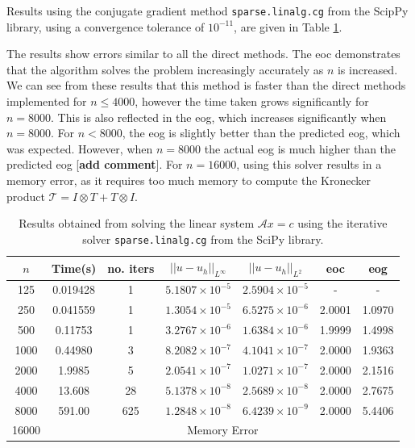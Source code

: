 \documentclass[11pt]{article}
\numberwithin{equation}{section}
\begin{document}
Results using the conjugate gradient method \texttt{sparse.linalg.cg} from the ScipPy library, using a convergence tolerance of $10^{-11}$, are given in Table \ref{table:kron it}. 

The results show errors similar to all the direct methods. The eoc demonstrates that the algorithm solves the problem increasingly accurately as $n$ is increased. We can see from these results that this method is faster than the direct methods implemented for $n \leq 4000$, however the time taken grows significantly for $n=8000$. This is also reflected in the eog, which increases significantly when $n=8000$. For $n<8000$, the eog is slightly better than the predicted eog, which was expected. However, when $n=8000$ the actual eog is much higher than the predicted eog [\textbf{add comment}]. For $n=16000$, using this solver results in a memory error, as it requires too much memory to compute the Kronecker product $\mathcal{T} = I \otimes T + T \otimes I$.

\begin{table}[H]
\centering
\begin{tabular}{|c|c|c|c|c|c|c|}
\hline
$n$ & Time(s) & no. iters & $|| u - u_h ||_{L^{\infty}}$ &$|| u - u_h ||_{L^{2}}$ & eoc & eog \\
\hline
125 & 0.019428 & 1 & $5.1807 \times 10^{-5}$ & $2.5904 \times 10^{-5}$ & - & - \\
250 & 0.041559 & 1 & $1.3054 \times 10^{-5}$ & $6.5275 \times 10^{-6}$ & 2.0001 & 1.0970 \\
500 & 0.11753 & 1 & $3.2767 \times 10^{-6}$ & $1.6384 \times 10^{-6}$ & 1.9999 & 1.4998 \\
1000 & 0.44980 & 3 & $8.2082 \times 10^{-7}$ & $4.1041 \times 10^{-7}$ & 2.0000 & 1.9363 \\
2000 & 1.9985 & 5 & $2.0541 \times 10^{-7}$ & $1.0271 \times 10^{-7}$ & 2.0000 & 2.1516 \\
4000 & 13.608 & 28 & $5.1378 \times 10^{-8}$ & $2.5689 \times 10^{-8}$ & 2.0000 & 2.7675 \\
8000 & 591.00 & 625 & $1.2848 \times 10^{-8}$ & $6.4239 \times 10^{-9}$ & 2.0000 & 5.4406 \\
\cline{2-7}
16000 & \multicolumn{6}{c|}{Memory Error} \\
\hline
\end{tabular}
\captionsetup{justification=centering}
\caption{Results obtained from solving the linear system $\mathcal{A} x = c$ using the iterative solver  \texttt{sparse.linalg.cg} from the SciPy library.}
\label{table:kron it}
\end{table}
\end{document}
